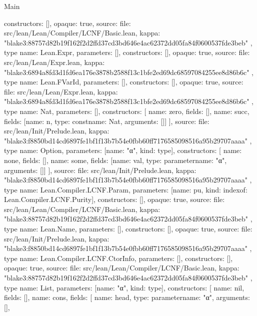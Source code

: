 \begin{lexlean}{Main}
\begin{toolingmodule}
{{      constructors: [],
      opaque: true,
      source: {
        file: src/lean/Lean/Compiler/LCNF/Basic.lean,
        kappa: "blake3:88757d82b19f162f2d2ffd37cd3bd646e4ac62372dd05fa84f0600537fde3beb"
      }
    },
    type{
      name: Lean.Expr,
      parameters: [],
      constructors: [],
      opaque: true,
      source: {
        file: src/lean/Lean/Expr.lean,
        kappa: "blake3:6894a8fd3d1fd6ea176e3878b2588f13c1bfe2ed69dc68597084255ee8d86b6c"
      }
    },
    type{
      name: Lean.FVarId,
      parameters: [],
      constructors: [],
      opaque: true,
      source: {
        file: src/lean/Lean/Expr.lean,
        kappa: "blake3:6894a8fd3d1fd6ea176e3878b2588f13c1bfe2ed69dc68597084255ee8d86b6c"
      }
    },
    type{
      name: Nat,
      parameters: [],
      constructors: [
        {name: zero, fields: []},
        {name: succ, fields: [{name: n, type: const{name: Nat, arguments: []}}]}
      ],
      source: {
        file: src/lean/Init/Prelude.lean,
        kappa: "blake3:f8850bd14cd6897fe1bf1f13b7b54e0fbb60ff7176585098516a95b29707aaaa"
      }
    },
    type{
      name: Option,
      parameters: [{name: "α", kind: type{}}],
      constructors: [
        {name: none, fields: []},
        {name: some, fields: [{name: val, type: parameter{name: "α", arguments: []}}]}
      ],
      source: {
        file: src/lean/Init/Prelude.lean,
        kappa: "blake3:f8850bd14cd6897fe1bf1f13b7b54e0fbb60ff7176585098516a95b29707aaaa"
      }
    },
    type{
      name: Lean.Compiler.LCNF.Param,
      parameters: [{name: pu, kind: index{of: Lean.Compiler.LCNF.Purity}}],
      constructors: [],
      opaque: true,
      source: {
        file: src/lean/Lean/Compiler/LCNF/Basic.lean,
        kappa: "blake3:88757d82b19f162f2d2ffd37cd3bd646e4ac62372dd05fa84f0600537fde3beb"
      }
    },
    type{
      name: Lean.Name,
      parameters: [],
      constructors: [],
      opaque: true,
      source: {
        file: src/lean/Init/Prelude.lean,
        kappa: "blake3:f8850bd14cd6897fe1bf1f13b7b54e0fbb60ff7176585098516a95b29707aaaa"
      }
    },
    type{
      name: Lean.Compiler.LCNF.CtorInfo,
      parameters: [],
      constructors: [],
      opaque: true,
      source: {
        file: src/lean/Lean/Compiler/LCNF/Basic.lean,
        kappa: "blake3:88757d82b19f162f2d2ffd37cd3bd646e4ac62372dd05fa84f0600537fde3beb"
      }
    },
    type{
      name: List,
      parameters: [{name: "α", kind: type{}}],
      constructors: [
        {name: nil, fields: []},
        {
          name: cons,
          fields: [
            {name: head, type: parameter{name: "α", arguments: []}},
}}}
\end{toolingmodule}
\end{lexlean}
